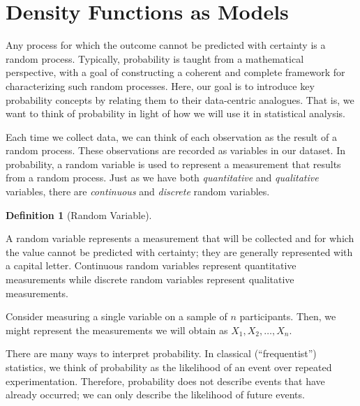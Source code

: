 \documentclass[
  letterpaper,
  DIV=11,
  numbers=noendperiod]{scrreprt}
\theoremstyle{definition}
\newtheorem{definition}{Definition}[chapter]
\theoremstyle{definition}
\theoremstyle{remark}
\begin{document}
\hypertarget{density-functions-as-models}{%
\section{Density Functions as
Models}\label{density-functions-as-models}}

Any process for which the outcome cannot be predicted with certainty is
a random process. Typically, probability is taught from a mathematical
perspective, with a goal of constructing a coherent and complete
framework for characterizing such random processes. Here, our goal is to
introduce key probability concepts by relating them to their
data-centric analogues. That is, we want to think of probability in
light of how we will use it in statistical analysis.

Each time we collect data, we can think of each observation as the
result of a random process. These observations are recorded as variables
in our dataset. In probability, a random variable is used to represent a
measurement that results from a random process. Just as we have both
\emph{quantitative} and \emph{qualitative} variables, there are
\emph{continuous} and \emph{discrete} random variables.

\begin{definition}[Random
Variable]\protect\hypertarget{def-random-variable}{}\label{def-random-variable}

A random variable represents a measurement that will be collected and
for which the value cannot be predicted with certainty; they are
generally represented with a capital letter. Continuous random variables
represent quantitative measurements while discrete random variables
represent qualitative measurements.

\end{definition}

Consider measuring a single variable on a sample of \(n\) participants.
Then, we might represent the measurements we will obtain as
\(X_1, X_2, \dots, X_n\).

\begin{tcolorbox}[enhanced jigsaw, left=2mm, toprule=.15mm, arc=.35mm, breakable, opacitybacktitle=0.6, opacityback=0, rightrule=.15mm, colbacktitle=quarto-callout-note-color!10!white, coltitle=black, leftrule=.75mm, toptitle=1mm, colframe=quarto-callout-note-color-frame, titlerule=0mm, title=\textcolor{quarto-callout-note-color}{\faInfo}\hspace{0.5em}{Note}, bottomrule=.15mm, colback=white, bottomtitle=1mm]

There are many ways to interpret probability. In classical
(``frequentist'') statistics, we think of probability as the likelihood
of an event over repeated experimentation. Therefore, probability does
not describe events that have already occurred; we can only describe the
likelihood of future events.

\end{tcolorbox}
\end{document}
